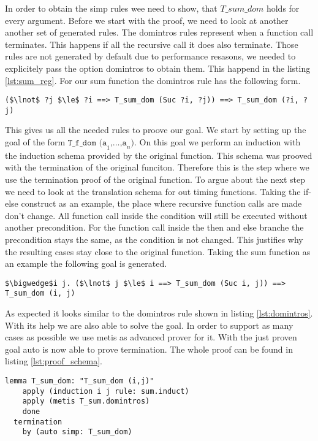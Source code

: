 In order to obtain the simp rules wee need to show, that $T\_sum\_dom$ holds for every argument.
Before we start with the proof, we need to look at another another set of generated rules.
The domintros rules represent when a function call terminates.
This happens if all the recursive call it does also terminate.
Those rules are not generated by default due to performance resasons, we needed to explicitely pass the option domintros to obtain them.
This happend in the listing \ref{lst:sum_reg}.
For our sum function the domintros rule has the following form.
\begin{lstlisting}[language=isabelle,mathescape=true,caption=T\_sum.domintros,label=lst:domintros]
  ($\lnot$ ?j $\le$ ?i ==> T_sum_dom (Suc ?i, ?j)) ==> T_sum_dom (?i, ?j)
\end{lstlisting}

This gives us all the needed rules to proove our goal.
We start by setting up the goal of the form $\texttt{T\_f\_dom (a}_{1}\texttt{,}\dots\texttt{,a}_{n}\texttt{)}$.
On this goal we perform an induction with the induction schema provided by the original function.
This schema was prooved with the termination of the original funciton.
Therefore this is the step where we use the termination proof of the original function.
To argue about the next step we need to look at the translation schema for out timing functions.
Taking the if-else construct as an example, the place where recursive function calls are made don't change.
All function call inside the condition will still be executed without another precondition.
For the function call inside the then and else branche the precondition stays the same, as the condition is not changed.
This justifies why the resulting cases stay close to the original function.
Taking the sum function as an example the following goal is generated.
\begin{lstlisting}[language=isabelle,mathescape=true]
  $\bigwedge$i j. ($\lnot$ j $\le$ i ==> T_sum_dom (Suc i, j)) ==> T_sum_dom (i, j)
\end{lstlisting}
As expected it looks similar to the domintros rule shown in listing \ref{lst:domintros}.
With its help we are also able to solve the goal.
In order to support as many cases as possible we use metis as advanced prover for it.
With the just proven goal auto is now able to prove termination.
The whole proof can be found in listing \ref{lst:proof_schema}.
\begin{lstlisting}[language=isabelle,mathescape=true,label=lst:proof_schema,caption=Proof schema over dom with help of original function]
  lemma T_sum_dom: "T_sum_dom (i,j)"
    apply (induction i j rule: sum.induct)
    apply (metis T_sum.domintros)
    done
  termination
    by (auto simp: T_sum_dom)
\end{lstlisting}

